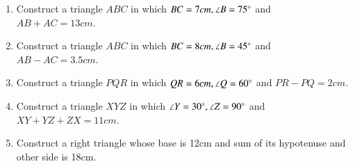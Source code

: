 \begin{enumerate}[label=\thesubsection.\arabic*,ref=\thesubsection.\theenumi]
\item Construct a triangle $ABC$ in which $BC=7cm, \angle{B}=75\degree$ and $AB + AC = 13 cm$.
\label{chapters/9/11/2/1}
	\\
	\solution 

%
\item Construct a triangle $ABC$ in which $BC=8cm, \angle{B}=45\degree$ and $AB - AC = 3.5 cm$.
\label{chapters/9/11/2/2}
\\
\solution

%
\item Construct a triangle $PQR$ in which $QR=6cm, \angle{Q}=60\degree$ and $PR - PQ = 2cm$.
\label{chapters/9/11/2/3}

%
\item Construct a triangle $XYZ$ in which $\angle{Y}=30\degree, \angle{Z}=90\degree$ and  $XY+YZ+ZX=11cm$.
\label{chapters/9/11/2/4}

%
\item Construct a right triangle whose base is 12cm and sum of its hypotenuse and other side is 18cm.
\label{chapters/9/11/2/5}

%
\end{enumerate}
